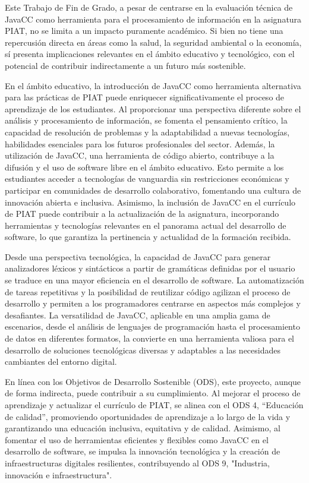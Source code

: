 \noindent Este Trabajo de Fin de Grado, a pesar de centrarse en la evaluación técnica de JavaCC como herramienta para el procesamiento de información en la asignatura PIAT, no se limita a un impacto puramente académico. Si bien no tiene una repercusión directa en áreas como la salud, la seguridad ambiental o la economía, sí presenta implicaciones relevantes en el ámbito educativo y tecnológico, con el potencial de contribuir indirectamente a un futuro más sostenible.

En el ámbito educativo, la introducción de JavaCC como herramienta alternativa para las prácticas de PIAT puede enriquecer significativamente el proceso de aprendizaje de los estudiantes. Al proporcionar una perspectiva diferente sobre el análisis y procesamiento de información, se fomenta el pensamiento crítico, la capacidad de resolución de problemas y la adaptabilidad a nuevas tecnologías, habilidades esenciales para los futuros profesionales del sector. Además, la utilización de JavaCC, una herramienta de código abierto, contribuye a la difusión y el uso de software libre en el ámbito educativo. Esto permite a los estudiantes acceder a tecnologías de vanguardia sin restricciones económicas y participar en comunidades de desarrollo colaborativo, fomentando una cultura de innovación abierta e inclusiva. Asimismo, la inclusión de JavaCC en el currículo de PIAT puede contribuir a la actualización de la asignatura, incorporando herramientas y tecnologías relevantes en el panorama actual del desarrollo de software, lo que garantiza la pertinencia y actualidad de la formación recibida.

Desde una perspectiva tecnológica, la capacidad de JavaCC para generar analizadores léxicos y sintácticos a partir de gramáticas definidas por el usuario se traduce en una mayor eficiencia en el desarrollo de software. La automatización de tareas repetitivas y la posibilidad de reutilizar código agilizan el proceso de desarrollo y permiten a los programadores centrarse en aspectos más complejos y desafiantes. La versatilidad de JavaCC, aplicable en una amplia gama de escenarios, desde el análisis de lenguajes de programación hasta el procesamiento de datos en diferentes formatos, la convierte en una herramienta valiosa para el desarrollo de soluciones tecnológicas diversas y adaptables a las necesidades cambiantes del entorno digital.

En línea con los Objetivos de Desarrollo Sostenible (ODS), este proyecto, aunque de forma indirecta, puede contribuir a su cumplimiento. Al mejorar el proceso de aprendizaje y actualizar el currículo de PIAT, se alinea con el ODS 4, ``Educación de calidad'', promoviendo oportunidades de aprendizaje a lo largo de la vida y garantizando una educación inclusiva, equitativa y de calidad. Asimismo, al fomentar el uso de herramientas eficientes y flexibles como JavaCC en el desarrollo de software, se impulsa la innovación tecnológica y la creación de infraestructuras digitales resilientes, contribuyendo al ODS 9, "Industria, innovación e infraestructura".

